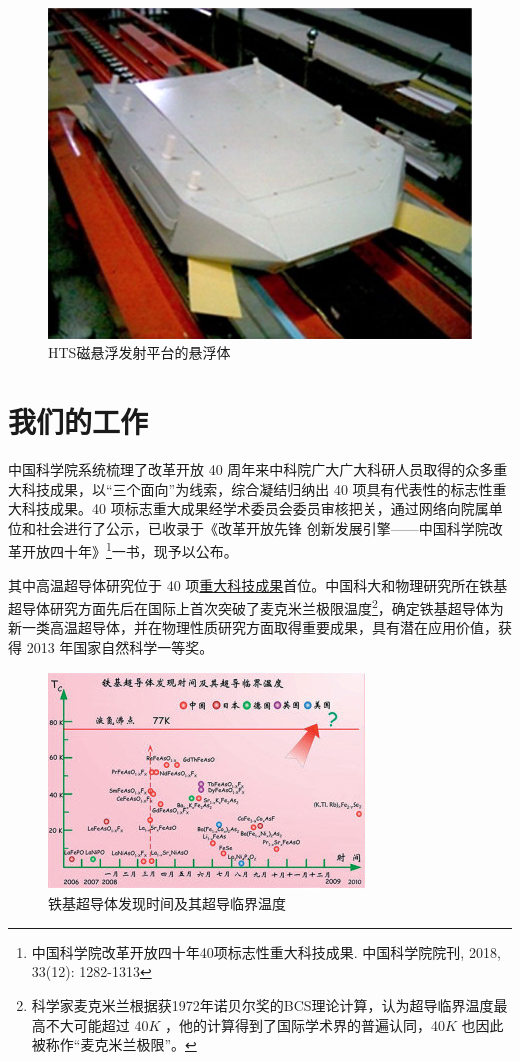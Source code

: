 \documentclass[UTF8, twocolumn]{ctexart}
\begin{document}
    \begin{figure}[ht]
        \centering
        \includegraphics[scale=0.8]{image/pan2010.jpg}
        \caption{HTS磁悬浮发射平台的悬浮体}
        \label{fig:image3}
    \end{figure}

\section{我们的工作}

    中国科学院系统梳理了改革开放 40 周年来中科院广大广大科研人员取得的众多重大科技成果，以“三个面向”为线索，综合凝结归纳出 40 项具有代表性的标志性重大科技成果。40 项标志重大成果经学术委员会委员审核把关，通过网络向院属单位和社会进行了公示，已收录于《改革开放先锋 创新发展引擎——中国科学院改革开放四十年》\footnote{中国科学院改革开放四十年40项标志性重大科技成果. 中国科学院院刊, 2018, 33(12): 1282-1313}一书，现予以公布。
    
    其中高温超导体研究位于 40 项\href{http://www.bulletin.cas.cn/publish_article/2018/12/20181202.htm}{重大科技成果}首位。中国科大和物理研究所在铁基超导体研究方面先后在国际上首次突破了麦克米兰极限温度\footnote{科学家麦克米兰根据获1972年诺贝尔奖的BCS理论计算，认为超导临界温度最高不大可能超过 40$K$ ，他的计算得到了国际学术界的普遍认同，40$K$ 也因此被称作“麦克米兰极限”。}，确定铁基超导体为新一类高温超导体，并在物理性质研究方面取得重要成果，具有潜在应用价值，获得 2013 年国家自然科学一等奖。

    \begin{figure}[h]
        \centering
        \includegraphics[scale=0.8]{image/铁基超导体.jpg}
        \caption{铁基超导体发现时间及其超导临界温度}
        \label{fig:image4}
    \end{figure}
\end{document}
